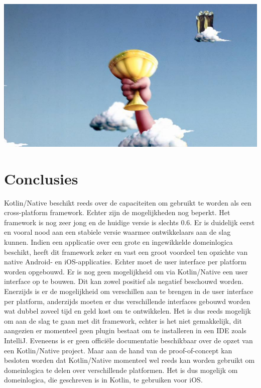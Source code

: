 \documentclass[a0,portrait]{a0poster}
\begin{document}
\begin{multicols}{2}
\begin{center}\vspace{1cm}
\includegraphics[width=1.0\linewidth]{grail}
\end{center}\vspace{1cm}
\fi




\color{HoGentAccent1} 
\section*{Conclusies}
\color{black}
Kotlin/Native beschikt reeds over de capaciteiten om gebruikt te worden als een cross-platform framework. Echter zijn de mogelijkheden nog beperkt. Het framework is nog zeer jong en de huidige versie is slechts 0.6. Er is duidelijk eerst en vooral nood aan een stabiele versie waarmee ontwikkelaars aan de slag kunnen. Indien een applicatie over een grote en ingewikkelde domeinlogica beschikt, heeft dit framework zeker en vast een groot voordeel ten opzichte van native Android- en iOS-applicaties. Echter moet de user interface per platform worden opgebouwd. Er is nog geen mogelijkheid om via Kotlin/Native een user interface op te bouwen. Dit kan zowel positief als negatief beschouwd worden. Enerzijds is er de mogelijkheid om verschillen aan te brengen in de user interface per platform, anderzijds moeten er dus verschillende interfaces gebouwd worden wat dubbel zoveel tijd en geld kost om te ontwikkelen. Het is dus reeds mogelijk om aan de slag te gaan met dit framework, echter is het niet gemakkelijk, dit aangezien er momenteel geen plugin bestaat om te installeren in een IDE zoals IntelliJ. Eveneens is er geen offici\"{e}le documentatie beschikbaar over de opzet van een Kotlin/Native project. Maar aan de hand van de proof-of-concept kan besloten worden dat Kotlin/Native momenteel wel reeds kan worden gebruikt om domeinlogica te delen over verschillende platformen. Het is dus mogelijk om domeinlogica, die geschreven is in Kotlin, te gebruiken voor iOS.
\color{HoGentAccent1} 

\end{multicols}
\end{document}
